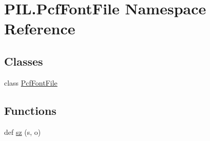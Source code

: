 \hypertarget{namespacePIL_1_1PcfFontFile}{}\section{P\+I\+L.\+Pcf\+Font\+File Namespace Reference}
\label{namespacePIL_1_1PcfFontFile}
\subsection*{Classes}
\begin{DoxyCompactItemize}
\item 
class \hyperlink{classPIL_1_1PcfFontFile_1_1PcfFontFile}{Pcf\+Font\+File}
\end{DoxyCompactItemize}
\subsection*{Functions}
\begin{DoxyCompactItemize}
\item 
def \hyperlink{namespacePIL_1_1PcfFontFile_a5b43932f8ab2eead2c334196489dfde2}{sz} (s, o)
\end{DoxyCompactItemize}

